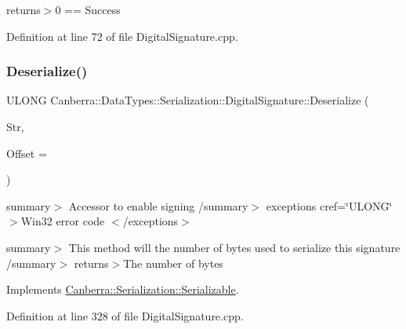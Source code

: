 returns$>$0 == Success

Definition at line 72 of file Digital\+Signature.\+cpp.

\mbox{\label{class_canberra_1_1_data_types_1_1_serialization_1_1_digital_signature_a0ac2ccfe7af9da4fab5f87783d226cb3_a0ac2ccfe7af9da4fab5f87783d226cb3}} 
\subsubsection{\texorpdfstring{Deserialize()}{Deserialize()}}
{\footnotesize\ttfamily U\+L\+O\+NG Canberra\+::\+Data\+Types\+::\+Serialization\+::\+Digital\+Signature\+::\+Deserialize (\begin{DoxyParamCaption}\item[{\hyperlink{class_canberra_1_1_utility_1_1_core_1_1_byte_stream}{Canberra\+::\+Utility\+::\+Core\+::\+Byte\+Stream} \&}]{Str,  }\item[{const L\+O\+NG}]{Offset = {} }\end{DoxyParamCaption})\hspace{0.3cm}{\ttfamily [virtual]}}

summary$>$ Accessor to enable signing /summary$>$ exceptions cref=\char`\"{}\+U\+L\+O\+N\+G\char`\"{}$>$Win32 error code $<$/exceptions$>$

summary$>$ This method will the number of bytes used to serialize this signature /summary$>$ returns$>$The number of bytes

Implements \hyperlink{class_canberra_1_1_serialization_1_1_serializable}{Canberra\+::\+Serialization\+::\+Serializable}.



Definition at line 328 of file Digital\+Signature.\+cpp.

\mbox{\label{class_canberra_1_1_data_types_1_1_serialization_1_1_digital_signature_a32357a654fc9dd78e75d0d427a6e5337_a32357a654fc9dd78e75d0d427a6e5337}} 
